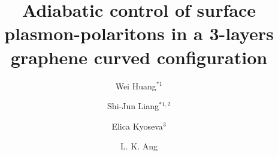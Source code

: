 \documentclass[preprint,12pt,numbers,sort&compress]{elsarticle}
\begin{document}
\doublespacing
\begin{frontmatter}




\title{Adiabatic control of surface plasmon-polaritons in a 3-layers graphene curved configuration}
\author{Wei Huang$^{\ast 1}$}
\author{Shi-Jun Liang$^{\ast 1,2}$}
\author{Elica Kyoseva$^{3}$}
\author{L. K. Ang}
\address{$^1$Engineering Product Development, Singapore University of Technology and Design, Singapore 138682.}
\address{$^2$National laboratory of solid state microstructures, School of physics, Collaborative Innovation Center of Advanced Microstructures, Nanjing university, Nanjing 210093, China. }
\address{$^3$Institute of Solid State Physics, Bulgarian Academy of Sciences, 72 Tsarigradsko Chaussee, 1784 Sofia, Bulgaria}





\end{frontmatter}
\end{document}
